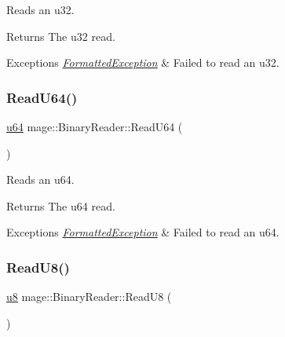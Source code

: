 Reads an {\ttfamily u32}.

\begin{DoxyReturn}{Returns}
The {\ttfamily u32} read. 
\end{DoxyReturn}

\begin{DoxyExceptions}{Exceptions}
{\em \hyperlink{structmage_1_1_formatted_exception}{Formatted\+Exception}} & Failed to read an {\ttfamily u32}. \\
\hline
\end{DoxyExceptions}
\hypertarget{classmage_1_1_binary_reader_a076c3f2ecc7634b297ae08b9fda48ea0}{}\label{classmage_1_1_binary_reader_a076c3f2ecc7634b297ae08b9fda48ea0} 
\subsubsection{\texorpdfstring{Read\+U64()}{ReadU64()}}
{\footnotesize\ttfamily \hyperlink{namespacemage_aee97da48a07394dd617c9deb60ed2064}{u64} mage\+::\+Binary\+Reader\+::\+Read\+U64 (\begin{DoxyParamCaption}{ }\end{DoxyParamCaption})\hspace{0.3cm}{\ttfamily [protected]}}

Reads an {\ttfamily u64}.

\begin{DoxyReturn}{Returns}
The {\ttfamily u64} read. 
\end{DoxyReturn}

\begin{DoxyExceptions}{Exceptions}
{\em \hyperlink{structmage_1_1_formatted_exception}{Formatted\+Exception}} & Failed to read an {\ttfamily u64}. \\
\hline
\end{DoxyExceptions}
\hypertarget{classmage_1_1_binary_reader_af9feb92c6991f62a3866aae9caead1c3}{}\label{classmage_1_1_binary_reader_af9feb92c6991f62a3866aae9caead1c3} 
\subsubsection{\texorpdfstring{Read\+U8()}{ReadU8()}}
{\footnotesize\ttfamily \hyperlink{namespacemage_a5a362e2d56fc439362a80516ecae7828}{u8} mage\+::\+Binary\+Reader\+::\+Read\+U8 (\begin{DoxyParamCaption}{ }\end{DoxyParamCaption})\hspace{0.3cm}{\ttfamily [protected]}}

